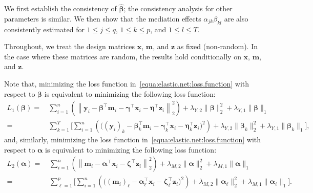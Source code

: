 \documentclass[
  12pt]{article}
\def\M{\mathbf{m}}
\def\X{\mathbf{x}}
\def\Y{\mathbf{y}}
\def\Z{\mathbf{z}}
\begin{document}
We first establish the consistency of $\widehat{\bm{\beta}}$; the consistency analysis for other parameters is similar. We then show that the mediation effects $\alpha_{jk} \beta_{kl}$ are also consistently estimated for $1 \le j \le q$, $1 \le k \le p$, and $1 \le l \le T$.

Throughout, we treat the design matrices $\X$, $\M$, and $\Z$ as fixed (non-random). In the case where these matrices are random, the results hold conditionally on $\X$, $\M$, and $\Z$.

Note that, minimizing the loss function in~\eqref{equa:elastic.net:loss.function} with respect to $\bm{\beta}$ is equivalent to minimizing the following loss function:
\begin{align}
	L_{1}(\bm{\beta})
	=  \,  &    \sum_{i=1}^{n} \left(    \left\|  \Y_{i}   -   \bm{\beta}^{\top} \M_{i}   -    \bm{\gamma}^{\top}\X_{i}  -    \bm{\eta}^{\top}\Z_{i}
	\right\|_{2}^{2}
	\right)
	+  \lambda_{Y,2}    \big\|  \bm{\beta}  \big\|_{2}^{2}   +    \lambda_{Y,1}    \big\|  \bm{\beta}   \big\|_{1}
	\nonumber
	\\
	=  \,  &  \sum_{k=1}^{T} \Bigg[    \sum_{i=1}^{n}  \left(   \big(  (\Y_{i})_{k}   -     \bm{\beta}_{k}^{\top} \M_{i}  -   \bm{\gamma}_{k}^{\top}\X_{i}   -   \bm{\eta}_{k}^{\top}\Z_{i}
	\big)^{2}
	\right)
	+  \lambda_{Y,2}  \big\|  \bm{\beta}_{k}   \big\|_{2}^{2}   +    \lambda_{Y,1}    \big\|  \bm{\beta}_{k} \big\|_{1}  \Bigg]  ,
	\label{equa:elastic.net:loss.function:beta_k}
\end{align}
and, similarly, minimizing the loss function in~\eqref{equa:elastic.net:loss.function} with respect to $\bm{\alpha}$ is equivalent to minimizing the following loss function:
\begin{align}
	L_{2}(\bm{\alpha})
	=  \,  &    \sum_{i=1}^{n} \left(    \left\|  \M_{i}   -      \bm{\alpha}^{\top}  \X_{i} -   \bm{\zeta}^{\top}\Z_{i} 
	\right\|_{2}^{2}
	\right)
	+  \lambda_{M,2}    \big\|  \bm{\alpha}  \big\|_{2}^{2}   +    \lambda_{M,1}    \big\|  \bm{\alpha}   \big\|_{1}
	\nonumber
	\\
	=  \,  &  \sum_{\ell=1}^{p} \Bigg[    \sum_{i=1}^{n}  \left(   \big(  (\M_{i})_{\ell}   -     \bm{\alpha}_{\ell}^{\top} \X_{i}  -    \bm{\zeta}_{\ell}^{\top} \Z_{i}
	\big)^{2}
	\right)
	+  \lambda_{M,2}  \big\|  \bm{\alpha}_{\ell}   \big\|_{2}^{2}   +    \lambda_{M,1}    \big\|  \bm{\alpha}_{\ell} \big\|_{1}  \Bigg].
\label{equa:elastic.net:loss.function:alpha_k}
\end{align}
\end{document}
